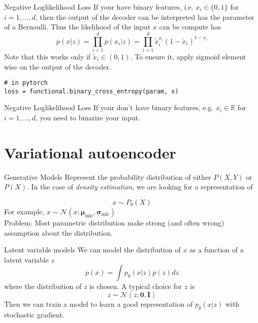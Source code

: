 \documentclass{beamer}
\newcommand{\real}{\mathbb{R}}
\begin{document}
\begin{frame}[fragile]{Negative Loglikelihood Loss}
If your have binary features, i.e. $x_i\in \{0,1\}$ for $i=1,...,d$, then the output of the decoder can be interpreted has the parameter of a Bernoulli. Thus the likelihood of the input $x$ can be compute has 
\begin{equation}
p(x|z)=\prod_{i=1}^dp(x_i|z) = \prod_{i=1}^d\tilde{x}_i^{x_i}(1-\tilde{x}_i)^{1-x_i}
\end{equation}
Note that this works only if $\tilde{x}_i\in (0, 1)$. To ensure it, apply sigmoid element wise on the output of the decoder.
\begin{verbatim}
# in pytorch
loss = functional.binary_cross_entropy(param, x)
\end{verbatim}
\end{frame}

\begin{frame}{Negative Loglikelihood Loss}
If your don't have binary features, e.g. $x_i\in \real$ for $i=1,...,d$, you need to binarize your input. 
\end{frame}

\section{Variational autoencoder}

\begin{frame}{Generative Models}
Represent the probability distribution of either $P(X,Y)$ or $P(X)$. In the case of \textit{density estimation}, we are looking for a representation of

\huge
\[
	x \sim P_\theta(X)
\]
\normalsize
For example, $x\sim \mathcal{N}(x;\bm{\mu}_{\text{mle}}, \bm{\sigma}_{\text{mle}})$ \\

Problem: Most parametric distribution make strong (and often wrong) assumption about the distribution.
\end{frame}

\begin{frame}{Latent variable models}
We can model the distribution of $x$ as a function of a latent variable $z$
\[
p(x) = \int p_\theta (x|z) p(z) dz
\]
where the distribution of $z$ is chosen. A typical choice for $z$ is 
\[
	z\sim \mathcal{N}(z;\bm{0}, \bm{I})
\]
Then we can train a model to learn a good representation of $p_\theta (x|z)$ with stochastic gradient.
\end{frame}
\end{document}
